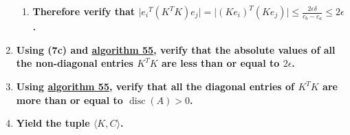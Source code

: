 \documentclass[twocolumn]{article}
\DeclareMathOperator{\disc}{disc}
\begin{document}
\begin{enumerate}
\begin{enumerate}
					\item \textbf{Therefore verify that $\lvert {e_i}^T(K^TK)e_j\rvert=\lvert(Ke_i)^T(Ke_j)\rvert\le\frac{2\epsilon\delta}{c_b-c_a}\le 2\epsilon$.}
				\end{enumerate}
				\item \textbf{Using (7c) and \hyperref[sec:algorithm 55]{algorithm 55}, verify that the absolute values of all the non-diagonal entries $K^TK$ are less than or equal to $2\epsilon$.}
				\item \textbf{Using \hyperref[sec:algorithm 55]{algorithm 55}, verify that all the diagonal entries of $K^TK$ are more than or equal to $\disc(A)>0$.}
				\item \textbf{Yield the tuple $\langle K,C\rangle$.}
			\end{enumerate}
\end{document}
